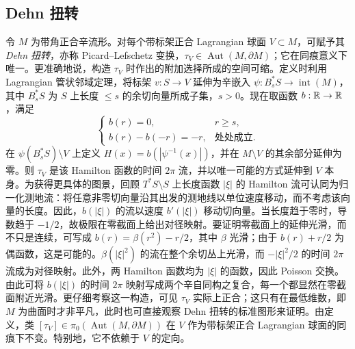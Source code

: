 ﻿\subsection{Dehn 扭转}\label{sec:16c}
令 $M$ 为带角正合辛流形。对每个带标架正合 Lagrangian 球面 $V\subset M$，可赋予其 \emph{Dehn 扭转}，亦称 Picard–Lefschetz 变换，$\tau_V\in\operatorname{Aut}(M,\partial M)$；它在同痕意义下唯一。更准确地说，构造 $\tau_V$ 时作出的附加选择所成的空间可缩。定义时利用 Lagrangian 管状邻域定理，将标架 $v:S\to V$ 延伸为辛嵌入 $\psi:B_s^*S\to\operatorname{int}(M)$，其中 $B_s^*S$ 为 $S$ 上长度 $\leq s$ 的余切向量所成子集，$s>0$。现在取函数 $b:\mathbb R\to\mathbb R$，满足
\begin{equation}\label{eq:16.5}
\begin{cases}
b(r)=0,&r\geq s,\\
b(r)-b(-r)=-r,&\text{处处成立}.
\end{cases}
\end{equation}
在 $\psi(B_s^*S)\setminus V$ 上定义 $H(x)=b(|\psi^{-1}(x)|)$，并在 $M\setminus V$ 的其余部分延伸为零。则 $\tau_V$ 是该 Hamilton 函数的时间 $2\pi$ 流，并以唯一可能的方式延伸到 $V$ 本身。为获得更具体的图景，回顾 $T^*S\setminus S$ 上长度函数 $|\xi|$ 的 Hamilton 流可认同为归一化测地流：将任意非零切向量沿其出发的测地线以单位速度移动，而不考虑该向量的长度。因此，$b(|\xi|)$ 的流以速度 $b'(|\xi|)$ 移动切向量。当长度趋于零时，导数趋于 $-1/2$，故极限在零截面上给出对径映射。要证明零截面上的延伸光滑，而不只是连续，可写成 $b(r)=\beta(r^2)-r/2$，其中 $\beta$ 光滑；由于 $b(r)+r/2$ 为偶函数，这是可能的。$\beta(|\xi|^2)$ 的流在整个余切丛上光滑，而 $-|\xi|^2/2$ 的时间 $2\pi$ 流成为对径映射。此外，两 Hamilton 函数均为 $|\xi|$ 的函数，因此 Poisson 交换。由此可将 $b(|\xi|)$ 的时间 $2\pi$ 映射写成两个辛自同构之复合，每一个都显然在零截面附近光滑。更仔细考察这一构造，可见 $\tau_V$ 实际上正合；这只有在最低维数，即 $M$ 为曲面时才非平凡，此时也可直接观察 Dehn 扭转的标准图形来证明。由定义，类 $[\tau_V]\in\pi_0(\operatorname{Aut}(M,\partial M))$ 在 $V$ 作为带标架正合 Lagrangian 球面的同痕下不变。特别地，它不依赖于 $V$ 的定向。

